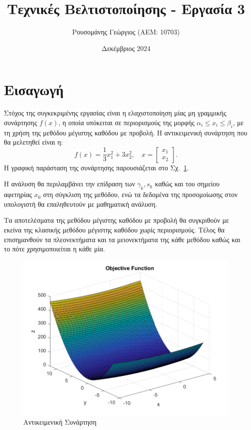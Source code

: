 \documentclass[a4paper,12pt]{article}
\title{Τεχνικές Βελτιστοποίησης - Εργασία 3}
\author{Ρουσομάνης Γεώργιος (ΑΕΜ: 10703)}
\date{Δεκέμβριος 2024}
\begin{document}
\maketitle

\section*{Εισαγωγή}

Στόχος της συγκεκριμένης εργασίας είναι η ελαχιστοποίηση μίας μη γραμμικής συνάρτησης $f(x)$, η οποία υπόκειται σε
περιορισμούς της μορφής $\alpha_i \leq x_i \leq \beta_i$, με τη χρήση της μεθόδου μέγιστης καθόδου με προβολή. 
Η αντικειμενική συνάρτηση που θα μελετηθεί είναι η:
\begin{equation}
    f(x) = \frac{1}{3} x_1^2 + 3 x_2^2, \quad x = \begin{bmatrix} x_1 \\ x_2 \end{bmatrix}.
\end{equation}
Η γραφική παράσταση της συνάρτησης παρουσιάζεται στο Σχ.~\ref{fig:objective_function}. 

Η ανάλυση θα περιλαμβάνει την επίδραση των $\gamma_k, s_k$ καθώς και του σημείου αφετηρίας $x_0$ στη σύγκλιση της
μεθόδου, ενώ τα δεδομένα της προσομοίωσης στον υπολογιστή θα επαληθευτούν με μαθηματική ανάλυση.

Τα αποτελέσματα της μεθόδου μέγιστης καθόδου με προβολή θα συγκριθούν με εκείνα της κλασικής μεθόδου μέγιστης 
καθόδου χωρίς περιορισμούς. Τέλος θα επισημανθούν τα πλεονεκτήματα και τα μειονεκτήματα της κάθε μεθόδου καθώς και το
πότε χρησιμοποιείται η κάθε μία.

\begin{figure}
    \centering
    \includegraphics[width=1\linewidth]{plot/objective_function.pdf}
    \caption{Αντικειμενική Συνάρτηση}
    \label{fig:objective_function}
\end{figure}
\end{document}
